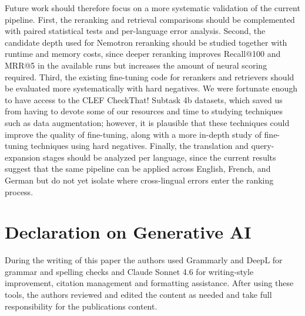 Future work should therefore focus on a more systematic validation of the current pipeline. First, the reranking and retrieval comparisons should be complemented with paired statistical tests and per-language error analysis. Second, the candidate depth used for Nemotron reranking should be studied together with runtime and memory costs, since deeper reranking improves Recall@100 and MRR@5 in the available runs but increases the amount of neural scoring required. Third, the existing fine-tuning code for rerankers and retrievers should be evaluated more systematically with hard negatives. We were fortunate enough to have access to the CLEF CheckThat! Subtask 4b datasets, which saved us from having to devote some of our resources and time to studying techniques such as data augmentation; however, it is plausible that these techniques could improve the quality of fine-tuning, along with a more in-depth study of fine-tuning techniques using hard negatives. Finally, the translation and query-expansion stages should be analyzed per language, since the current results suggest that the same pipeline can be applied across English, French, and German but do not yet isolate where cross-lingual errors enter the ranking process.



\section {Declaration on Generative AI}
During the writing of this paper the authors used Grammarly and DeepL for grammar and spelling checks and Claude Sonnet 4.6 for writing-style improvement, citation management and formatting assistance. After using these tools, the authors reviewed and edited the content as needed and take full responsibility for the publications content.